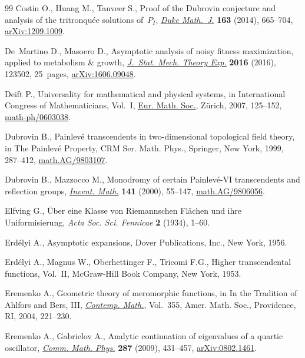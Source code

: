 \documentclass[pdftex]{sigma}
\numberwithin{equation}{section}
\begin{document}
\begin{thebibliography}{99}
Costin O., Huang M., Tanveer S., Proof of the {D}ubrovin conjecture and
 analysis of the tritronqu\'ee solutions of~{$P_I$}, \href{https://doi.org/10.1215/00127094-2429589}{\textit{Duke Math.~J.}}
 \textbf{163} (2014), 665--704, \href{https://arxiv.org/abs/1209.1009}{arXiv:1209.1009}.

De~Martino D., Masoero D., Asymptotic analysis of noisy f\/itness maximization,
 applied to metabolism \& growth, \href{https://doi.org/10.1088/1742-5468/aa4e8f}{\textit{J.~Stat. Mech. Theory Exp.}}
 \textbf{2016} (2016), 123502, 25~pages, \href{https://arxiv.org/abs/1606.09048}{arXiv:1606.09048}.

Deift P., Universality for mathematical and physical systems, in International
 {C}ongress of {M}athematicians, {V}ol.~{I}, \href{https://doi.org/10.4171/022-1/7}{Eur. Math. Soc.}, Z\"urich, 2007,
 125--152, \href{https://arxiv.org/abs/math-ph/0603038}{math-ph/0603038}.

Dubrovin B., Painlev\'e transcendents in two-dimensional topological f\/ield
 theory, in The {P}ainlev\'e Property, CRM Ser. Math. Phys., Springer, New
 York, 1999, 287--412, \href{https://arxiv.org/abs/math.AG/9803107}{math.AG/9803107}.

Dubrovin B., Mazzocco M., Monodromy of certain {P}ainlev\'e-{VI} transcendents
 and ref\/lection groups, \href{https://doi.org/10.1007/PL00005790}{\textit{Invent. Math.}} \textbf{141} (2000), 55--147,
 \href{https://arxiv.org/abs/math.AG/9806056}{math.AG/9806056}.

Elfving G., \"Uber eine {K}lasse von {R}iemannschen {F}l\"achen und ihre
 {U}niformisierung, \textit{Acta Soc. Sci. Fennicae} \textbf{2} (1934), 1--60.

Erd\'elyi A., Asymptotic expansions, Dover Publications, Inc., New York, 1956.

Erd{\'e}lyi A., Magnus W., Oberhettinger F., Tricomi F.G., Higher
 transcendental functions, {V}ol.~{II}, McGraw-Hill Book Company, New York,
 1953.

Eremenko A., Geometric theory of meromorphic functions, in In the Tradition of
 {A}hlfors and {B}ers, {III}, \href{https://doi.org/10.1090/conm/355/06453}{\textit{Contemp. Math.}}, Vol.~355, Amer. Math.
 Soc., Providence, RI, 2004, 221--230.

Eremenko A., Gabrielov A., Analytic continuation of eigenvalues of a quartic
 oscillator, \href{https://doi.org/10.1007/s00220-008-0663-6}{\textit{Comm. Math. Phys.}} \textbf{287} (2009), 431--457,
 \href{https://arxiv.org/abs/0802.1461}{arXiv:0802.1461}.


\end{thebibliography}
\end{document}
